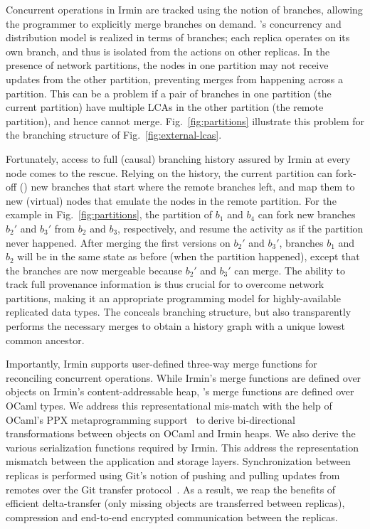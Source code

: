 Concurrent operations in Irmin are tracked using the notion of
branches, allowing the programmer to explicitly merge branches on
demand. \name's concurrency and distribution model is realized in
terms of branches; each replica operates on its own branch, and thus
is isolated from the actions on other replicas. In the presence of
network partitions, the nodes in one partition may not receive updates
from the other partition, preventing merges from happening across a
partition. This can be a problem if a pair of branches in one
partition (the current partition) have multiple LCAs in the other
partition (the remote partition), and hence cannot
merge. Fig.~\ref{fig:partitions} illustrate this problem for the
branching structure of Fig.~\ref{fig:external-lcas}.

Fortunately, access to full (causal) branching history assured by
Irmin at every node comes to the rescue. Relying on the history, the
current partition can fork-off () new branches that start
where the remote branches left, and map them to new (virtual) nodes
that emulate the nodes in the remote partition. For the example in
Fig.~\ref{fig:partitions}, the partition of $b_1$ and $b_4$ can fork
new branches $b_2'$ and $b_3'$ from $b_2$ and $b_3$, respectively, and
resume the activity as if the partition never happened. After merging
the first versions on $b_2'$ and $b_3'$, branches $b_1$ and $b_2$ will
be in the same state as before (when the partition happened), except
that the branches are now mergeable because $b_2'$ and $b_3'$ can
merge. The ability to track full provenance information is thus
crucial for \name to overcome network partitions, making it an
appropriate programming model for highly-available replicated data
types. The \nameMonad conceals branching structure, but also
transparently performs the necessary merges to obtain a history graph
with a unique lowest common ancestor.

Importantly, Irmin supports user-defined three-way merge functions for
reconciling concurrent operations. While Irmin's merge functions are defined
over objects on Irmin's content-addressable heap, \name's merge functions are
defined over OCaml types. We address this representational mis-match with the
help of OCaml's PPX metaprogramming support~\cite{ppx} to derive bi-directional
transformations between objects on OCaml and Irmin heaps. We also derive the
various serialization functions required by Irmin. This address the representation
mismatch between the application and storage layers. Synchronization between
replicas is performed using Git's notion of pushing and pulling updates from
remotes over the Git transfer protocol~\cite{git-tp}. As a result, we reap the
benefits of efficient delta-transfer (only missing objects are transferred
between replicas), compression and end-to-end encrypted communication between
the replicas.
